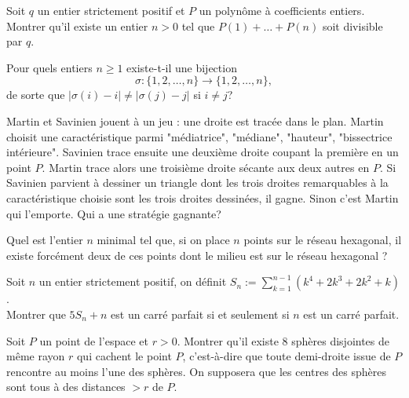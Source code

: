 \begin{exo}{}
Soit $q$ un entier strictement positif et $P$ un polynôme à coefficients entiers. Montrer qu'il existe un entier $n>0$ tel que $P(1)+\dots+P(n)$ soit divisible par $q$.\end{exo}

\begin{exo}{}
Pour quels entiers $n \geq 1$ existe-t-il une bijection
\[\sigma : \{ 1,2, \ldots,n\} \rightarrow \{ 1,2, \ldots,n\},\]
de sorte que $\vert \sigma(i)-i \vert \neq \vert \sigma(j)-j \vert$ si $i \neq j$?
\end{exo}

\begin{exo}{}
Martin et Savinien jouent à un jeu : une droite est tracée dans le plan. Martin choisit une caractéristique parmi "médiatrice", "médiane", "hauteur", "bissectrice intérieure". Savinien trace ensuite une deuxième droite coupant la première en un point $P$. Martin trace alors une troisième droite sécante aux deux autres en $P$. Si Savinien parvient à dessiner un triangle dont les trois droites remarquables à la caractéristique choisie sont les trois droites dessinées, il gagne. Sinon c'est Martin qui l'emporte. Qui a une stratégie gagnante?
\end{exo}


\begin{exo}{ }
Quel est l'entier $n$ minimal tel que, si on place $n$ points sur le
réseau hexagonal, il existe forcément deux de ces points dont le milieu est sur
le réseau hexagonal ?
\end{exo}

\begin{exo}{}
Soit $n$ un entier strictement positif, on définit $S_n := \sum\limits_{k=1}^{n-1} (k^4+2k^3+2k^2+k)$.\\
Montrer que $5S_n+n$ est un carré parfait si et seulement si $n$ est un carré parfait.
\end{exo}

\begin{exo}{}
Soit $P$ un point de l'espace
et $r>0$. Montrer qu'il existe $8$ sphères disjointes de même rayon
$r$ qui cachent le point $P$, c'est-à-dire que toute demi-droite
issue de $P$ rencontre au moins l'une des sphères. On supposera que
les centres des sphères sont tous à des distances $>r$ de $P$.
\end{exo}

